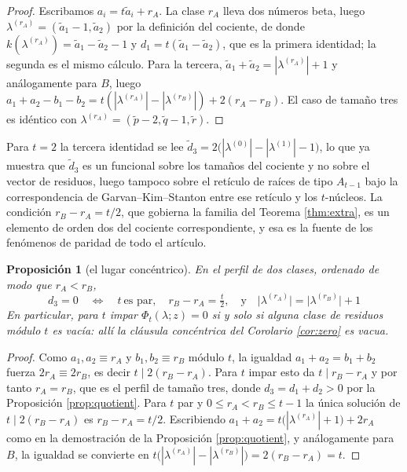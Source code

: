 \documentclass[11pt,reqno]{amsart}
\theoremstyle{plain}
\newtheorem{proposition}[theorem]{Proposición}
\theoremstyle{definition}
\begin{document}
\begin{proof}
Escribamos $a_i=t\tilde a_i+r_A$. La clase $r_A$ lleva dos números beta, luego
$\lambda^{(r_A)}=(\tilde a_1-1,\tilde a_2)$ por la definición del cociente, de donde
$k(\lambda^{(r_A)})=\tilde a_1-\tilde a_2-1$ y $d_1=t(\tilde a_1-\tilde a_2)$, que es la primera
identidad; la segunda es el mismo cálculo. Para la tercera, $\tilde a_1+\tilde a_2=|\lambda^{(r_A)}|+1$
y análogamente para $B$, luego $a_1+a_2-b_1-b_2=t(|\lambda^{(r_A)}|-|\lambda^{(r_B)}|)+2(r_A-r_B)$. El
caso de tamaño tres es idéntico con $\lambda^{(r_A)}=(\tilde p-2,\tilde q-1,\tilde r)$.
\end{proof}

Para $t=2$ la tercera identidad se lee $\tilde d_3=2\bigl(|\lambda^{(0)}|-|\lambda^{(1)}|-1\bigr)$, lo que
ya muestra que $\tilde d_3$ es un funcional sobre los tamaños del cociente y no sobre el vector de
residuos, luego tampoco sobre el retículo de raíces de tipo $A_{t-1}$ bajo la correspondencia de
Garvan--Kim--Stanton \cite{GKS90} entre ese retículo y los $t$-núcleos. La condición $r_B-r_A=t/2$,
que gobierna la familia del Teorema \ref{thm:extra}, es un elemento de orden dos del cociente
correspondiente, y esa es la fuente de los fenómenos de paridad de todo el artículo.

\begin{proposition}[el lugar concéntrico]\label{rem:lattice}
En el perfil de dos clases, ordenado de modo que $r_A<r_B$,
\[
\boxed{\;\;d_3=0\quad\Longleftrightarrow\quad t\ \text{es par},\quad r_B-r_A=\tfrac t2,
\quad\text{y}\quad \bigl|\lambda^{(r_A)}\bigr|=\bigl|\lambda^{(r_B)}\bigr|+1\;\;}
\]
En particular, para $t$ impar $\Phi_t(\lambda;z)=0$ si y solo si alguna clase de residuos módulo $t$
es vacía: allí la cláusula concéntrica del Corolario \ref{cor:zero} es vacua.
\end{proposition}

\begin{proof}
Como $a_1,a_2\equiv r_A$ y $b_1,b_2\equiv r_B$ módulo $t$, la igualdad $a_1+a_2=b_1+b_2$ fuerza
$2r_A\equiv2r_B$, es decir $t\mid2(r_B-r_A)$. Para $t$ impar esto da $t\mid r_B-r_A$ y por tanto
$r_A=r_B$, que es el perfil de tamaño tres, donde $d_3=d_1+d_2>0$ por la Proposición
\ref{prop:quotient}. Para $t$ par y $0\le r_A<r_B\le t-1$ la única solución de $t\mid2(r_B-r_A)$ es
$r_B-r_A=t/2$. Escribiendo $a_1+a_2=t\bigl(|\lambda^{(r_A)}|+1\bigr)+2r_A$ como en la demostración
de la Proposición \ref{prop:quotient}, y análogamente para $B$, la igualdad se convierte en
$t\bigl(|\lambda^{(r_A)}|-|\lambda^{(r_B)}|\bigr)=2(r_B-r_A)=t$.
\end{proof}
\end{document}
